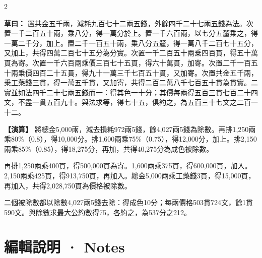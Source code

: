 \documentclass[11pt,a4paper]{article}
\newcommand{\ClassicalWorking}[1]{\par\noindent\textbf{草曰：}#1\par}
\newcommand{\ModernWorking}[1]{\par\noindent\textbf{【演算】}#1\par}
\begin{document}
\begin{paracol}{2}

\ClassicalWorking{%
置共金五千兩，減耗九百七十二兩五錢，外餘四千二十七兩五錢為法。次置一千二百五十兩，乘八分，得一萬分於上。置一千六百兩，以七分五釐乗之，得一萬二千分，加上。置二千一百五十兩，乗八分五釐，得一萬八千二百七十五分，又加上，共得四萬二百七十五分為分實。次置一千二百五十兩乗四百貫，得五十萬貫為寄。次置一千六百兩乘價三百七十五貫，得六十萬貫，加寄。次置二千一百五十兩乗價四百二十五貫，得九十一萬三千七百五十貫，又加寄。次置共金五千兩，乗工藥錢三貫，得一萬五千貫，又加寄，共得二百二萬八千七百五十貫為貫實。二實並如法四千二十七兩五錢而一：得其色一十分；其價每兩得五百三貫七百二十四文，不盡一貫五百九十。與法求等，得七十五，俱約之，為五百三十七文之二百一十二。}

\switchcolumn

\ModernWorking{%
將總金5,000兩，減去損耗972兩5錢，餘4,027兩5錢為除數。再排1,250兩乘80\%（0.8），得10,000分。排1,600兩乘75\%（0.75），得12,000分，加上。排2,150兩乘85\%（0.85），得18,275分，再加，共得40,275分為成色被除數。

再排1,250兩乘400貫，得500,000貫為寄。1,600兩乘375貫，得600,000貫，加入。2,150兩乘425貫，得913,750貫，再加入。總金5,000兩乘工藥錢3貫，得15,000貫，再加入，共得2,028,750貫為價格被除數。

二個被除數都以除數4,027兩5錢去除：得成色10分；每兩價格503貫724文，餘1貫590文。與除數求最大公約數得75，各約之，為537分之212。
}

\end{paracol}



\newpage
\section*{\color{titlecolor}編輯說明 · Notes}
\end{document}
